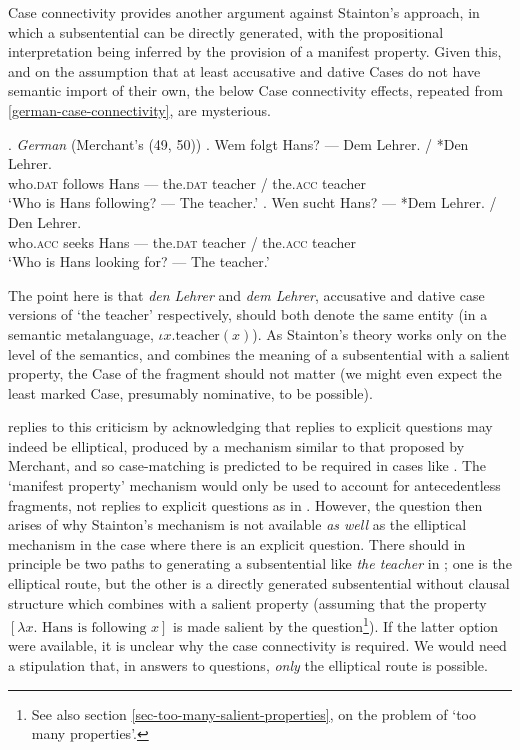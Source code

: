 \documentclass[doublespace]{umthesis}
\newcommand{\pred}[1]{\ensuremath{\mathrm{{#1}}}}
\begin{document}

Case connectivity provides another argument against Stainton's approach, in which a subsentential can be directly generated, with the propositional interpretation being inferred by the provision of a manifest property. Given this, and on the assumption that at least accusative and dative Cases do not have semantic import of their own, the below Case connectivity effects, repeated from \ref{german-case-connectivity}, are mysterious.

\ex. 		{\it German} (Merchant's (49, 50))
		\ag. Wem folgt Hans? --- Dem Lehrer. / *Den Lehrer. \\
			who.\textsc{dat} follows Hans --- the.\textsc{dat} teacher / the.\textsc{acc} teacher \\
			`Who is Hans following? --- The teacher.'
		\bg. Wen sucht Hans? --- *Dem Lehrer. / Den Lehrer. \\
			who.\textsc{acc} seeks Hans --- the.\textsc{dat}  teacher / the.\textsc{acc} teacher \\
			`Who is Hans looking for? --- The teacher.'
			
The point here is that {\it den Lehrer} and {\it dem Lehrer}, accusative and dative case versions of `the teacher' respectively, should both denote the same entity (in a semantic metalanguage, $\iota x. \pred{teacher}(x)$). As Stainton's theory works only on the level of the semantics, and combines the meaning of a subsentential with a salient property, the Case of the fragment should not matter (we might even expect the least marked Case, presumably nominative, to be possible).

\cite{St06book} replies to this criticism by acknowledging that replies to explicit questions may indeed be elliptical, produced by a mechanism similar to that proposed by Merchant, and so case-matching is predicted to be required in cases like \Last. The `manifest property' mechanism would only be used to account for antecedentless fragments, not replies to explicit questions as in \Last. However, the question then arises of why Stainton's mechanism is not available \emph{as well} as the elliptical mechanism in the case where there is an explicit question. There should in principle be two paths to generating a subsentential like {\it the teacher} in \Last; one is the elliptical route, but the other is a directly generated subsentential without clausal structure which combines with a salient property (assuming that the property $[\lambda x. \textrm{ Hans is following } x]$ is made salient by the question\footnote{See also section \ref{sec-too-many-salient-properties}, on the problem of `too many properties'.}). If the latter option were available, it is unclear why the case connectivity is required. We would need a stipulation that, in answers to questions, \emph{only} the elliptical route is possible.
\end{document}
